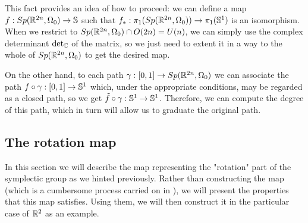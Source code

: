 This fact provides an idea of how to proceed: we can define a map $f : Sp(\mathbb{R}^{2n},\Omega_0) \rightarrow \mathbb{S}$ such that $f_{\ast} : \pi_1(Sp(\mathbb{R}^{2n},\Omega_0)) \rightarrow \pi_1(\mathbb{S}^1)$ is an isomorphism. When we restrict to $Sp(\mathbb{R}^{2n},\Omega_0) \cap O(2n) = U(n)$, we can simply use the complex determinant $\text{det}_{\mathbb{C}}$ of the matrix, so we just need to extent it in a way to the whole of $Sp(\mathbb{R}^{2n},\Omega_0)$ to get the desired map.

On the other hand, to each path $\gamma : [0,1] \rightarrow Sp(\mathbb{R}^{2n},\Omega_0)$ we can associate the path $f \circ \gamma : [0,1] \rightarrow \mathbb{S}^1$ which, under the appropriate conditions, may be regarded as a closed path, so we get $\tilde{f} \circ \gamma : \mathbb{S}^1 \rightarrow \mathbb{S}^1$. Therefore, we can compute the degree of this path, which in turn will allow us to graduate the original path.

\subsection{The rotation map}

In this section we will describe the map representing the "rotation" part of the symplectic group as we hinted previously. Rather than constructing the map (which is a cumbersome process carried on in \cite{gutt2012conley}), we will present the properties that this map satisfies. Using them, we will then construct it in the particular case of $\mathbb{R}^2$ as an example.

